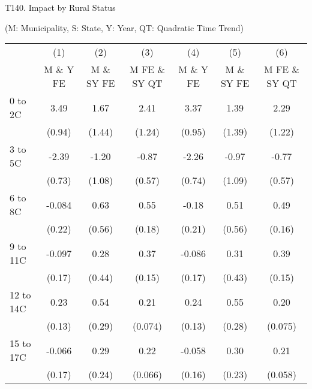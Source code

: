 \documentclass[paper=letterpaper, fontsize=11pt]{article} %
\begin{document}
\newpage

\begin{center}
T140. Impact by Rural Status

(M: Municipality, S: State, Y: Year, QT: Quadratic Time Trend)
\end{center}

\begin{longtable}{l*{6}{c}} \hline\hline\endfirsthead\hline\endhead\hline\endfoot\endlastfoot
                    &\multicolumn{1}{c}{(1)}&\multicolumn{1}{c}{(2)}&\multicolumn{1}{c}{(3)}&\multicolumn{1}{c}{(4)}&\multicolumn{1}{c}{(5)}&\multicolumn{1}{c}{(6)}\\
                    &\multicolumn{1}{c}{M \& Y FE}&\multicolumn{1}{c}{M \& SY FE}&\multicolumn{1}{c}{M FE \& SY QT}&\multicolumn{1}{c}{M \& Y FE}&\multicolumn{1}{c}{M \& SY FE}&\multicolumn{1}{c}{M FE \& SY QT}\\
\hline
0 to 2C             &        3.49&        1.67&        2.41&        3.37&        1.39&        2.29\\
                    &      (0.94)&      (1.44)&      (1.24)&      (0.95)&      (1.39)&      (1.22)\\
3 to 5C             &       -2.39&       -1.20&       -0.87&       -2.26&       -0.97&       -0.77\\
                    &      (0.73)&      (1.08)&      (0.57)&      (0.74)&      (1.09)&      (0.57)\\
6 to 8C             &      -0.084&        0.63&        0.55&       -0.18&        0.51&        0.49\\
                    &      (0.22)&      (0.56)&      (0.18)&      (0.21)&      (0.56)&      (0.16)\\
9 to 11C            &      -0.097&        0.28&        0.37&      -0.086&        0.31&        0.39\\
                    &      (0.17)&      (0.44)&      (0.15)&      (0.17)&      (0.43)&      (0.15)\\
12 to 14C           &        0.23&        0.54&        0.21&        0.24&        0.55&        0.20\\
                    &      (0.13)&      (0.29)&     (0.074)&      (0.13)&      (0.28)&     (0.075)\\
15 to 17C           &      -0.066&        0.29&        0.22&      -0.058&        0.30&        0.21\\
                    &      (0.17)&      (0.24)&     (0.066)&      (0.16)&      (0.23)&     (0.058)\\

\end{longtable}
\end{document}
